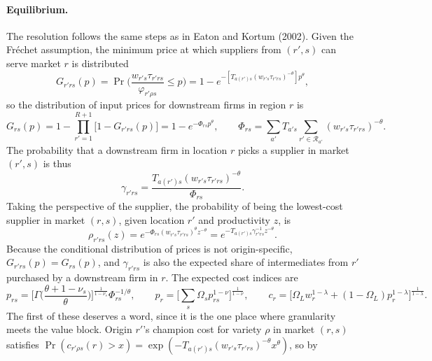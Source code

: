 \paragraph{Equilibrium.} The resolution follows the same steps as in Eaton and Kortum (2002).
Given the Fr\'echet assumption, the minimum price at which suppliers from $(r',s)$ can serve
market $r$ is distributed
\begin{equation}
G_{r'rs}(p)=\Pr\Big(\frac{w_{r's}\tau_{r'rs}}{\varphi_{r'\rho s}}\le p\Big)
=1-e^{-\left[T_{a(r')s}(w_{r's}\tau_{r'rs})^{-\theta}\right]p^{\theta}},
\end{equation}
so the distribution of input prices for downstream firms in region $r$ is
\begin{equation}
G_{rs}(p)=1-\prod_{r'=1}^{R+1}\big[1-G_{r'rs}(p)\big]=1-e^{-\Phi_{rs}p^{\theta}},
\qquad
\Phi_{rs}=\sum_{a'}T_{a's}\sum_{r'\in\mathcal{R}_{a'}}(w_{r's}\tau_{r'rs})^{-\theta}.
\label{eq:app-Phi}
\end{equation}
The probability that a downstream firm in location $r$ picks a supplier in market $(r',s)$ is
thus
\begin{equation}
\gamma_{r'rs}=\frac{T_{a(r')s}(w_{r's}\tau_{r'rs})^{-\theta}}{\Phi_{rs}} .
\label{eq:app-share}
\end{equation}
Taking the perspective of the supplier, the probability of being the lowest-cost supplier in
market $(r,s)$, given location $r'$ and productivity $z$, is
\begin{equation}
\rho_{r'rs}(z)=e^{-\Phi_{rs}(w_{r's}\tau_{r'rs})^{\theta}z^{-\theta}}
=e^{-T_{a(r')s}\gamma^{-1}_{r'rs}z^{-\theta}} .
\label{eq:app-rho}
\end{equation}
Because the conditional distribution of prices is not origin-specific,
$G_{r'rs}(p)=G_{rs}(p)$, and $\gamma_{r'rs}$ is also the expected share of intermediates from
$r'$ purchased by a downstream firm in $r$. The expected cost indices are
\begin{equation}
p_{rs}=\Big[\Gamma\Big(\frac{\theta+1-\nu_{s}}{\theta}\Big)\Big]^{\frac{1}{1-\nu_{s}}}\Phi_{rs}^{-1/\theta},
\qquad
p_{r}=\Big[\sum_{s}\Omega_{s}p_{rs}^{1-\nu}\Big]^{\frac{1}{1-\nu}},
\qquad
c_{r}=\Big[\Omega_{L}w_{r}^{1-\lambda}+(1-\Omega_{L})p_{r}^{1-\lambda}\Big]^{\frac{1}{1-\lambda}} .
\end{equation}
The first of these deserves a word, since it is the one place where granularity meets the value
block. Origin $r'$'s champion cost for variety $\rho$ in market $(r,s)$ satisfies
$\Pr(c_{r'\rho s}(r)>x)=\exp(-T_{a(r')s}(w_{r's}\tau_{r'rs})^{-\theta}x^{\theta})$, so by
